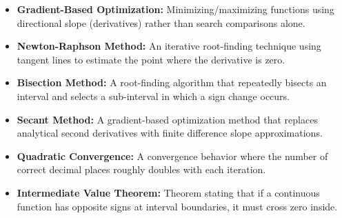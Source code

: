 \documentclass[12pt,a4paper]{article}
\begin{document}
\begin{tcolorbox}[defbox, title={\textbf{One-Line Definitions}}]
\begin{itemize}[leftmargin=*, itemsep=2.5pt, topsep=0pt]
  \item \textbf{Gradient-Based Optimization:} Minimizing/maximizing functions using directional slope (derivatives) rather than search comparisons alone.
  \item \textbf{Newton-Raphson Method:} An iterative root-finding technique using tangent lines to estimate the point where the derivative is zero.
  \item \textbf{Bisection Method:} A root-finding algorithm that repeatedly bisects an interval and selects a sub-interval in which a sign change occurs.
  \item \textbf{Secant Method:} A gradient-based optimization method that replaces analytical second derivatives with finite difference slope approximations.
  \item \textbf{Quadratic Convergence:} A convergence behavior where the number of correct decimal places roughly doubles with each iteration.
  \item \textbf{Intermediate Value Theorem:} Theorem stating that if a continuous function has opposite signs at interval boundaries, it must cross zero inside.
\end{itemize}
\end{tcolorbox}
\end{document}
